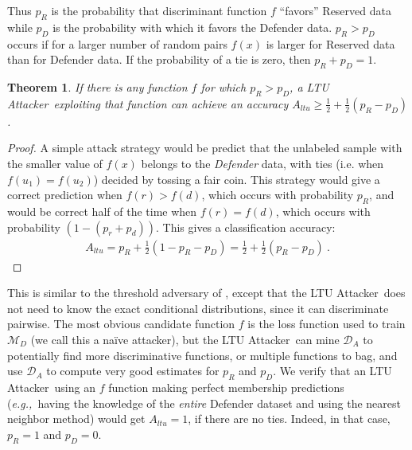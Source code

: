 \documentclass[letterpaper]{article}
\newcommand{\eg}{{\em e.g.,~}}
\newcommand{\oracle}{LTU Attacker~}
\newtheorem{theorem}{Theorem}
\begin{document}
Thus $p_R$ is the probability that discriminant function $f$ ``favors'' Reserved data while $p_D$ is the probability with which it favors the Defender data. $p_R  > p_D$ occurs if for a larger number of random pairs $f(x)$ is larger for Reserved data than for Defender data. If the probability of a tie is zero, then $p_R+p_D=1$.



\begin{theorem}\label{thm:pairwise}
If there is any function $f$ for which $p_R  > p_D$, a \oracle exploiting that function can achieve an accuracy $A_{ltu} \ge \frac{1}{2} + \frac{1}{2}(p_R - p_D)$.
\end{theorem}

\begin{proof}
A simple attack strategy would be predict that the unlabeled sample with the smaller value of $f(x)$ belongs to the {\em Defender} data, with ties (i.e. when $f(u_1)=f(u_2)$) decided by tossing a fair coin. This strategy would give a correct prediction when $f(r)>f(d)$, which occurs with probability $p_R$, and would be correct half of the time when $f(r)=f(d)$, which occurs with probability $(1-(p_r+p_d))$. This gives a classification accuracy:
\begin{align}
A_{ltu} = p_R + \frac{1}{2}(1- p_R- p_D)= \frac{1}{2} + \frac{1}{2}(p_R - p_D)~.
\end{align}
\end{proof}

This is similar to the threshold adversary of \cite{yeom2018privacy}, except that the \oracle does not need to know the exact conditional distributions, since it can discriminate pairwise. The most obvious candidate function $f$ is the loss function used to train $\mathcal{M}_D$ (we call this a na\"ive attacker), but the \oracle can mine $\mathcal{D}_A$ to potentially find more discriminative functions, or multiple functions to bag, and use $\mathcal{D}_A$ to compute very good estimates for $p_R$ and $p_D$. We verify that an \oracle using an $f$ function making perfect membership predictions (\eg having the knowledge of the {\em entire} Defender dataset and using the nearest neighbor method) would get $A_{ltu} = 1$, if there are no ties. Indeed, in that case, $p_R=1$ and $p_D=0$.
\end{document}
